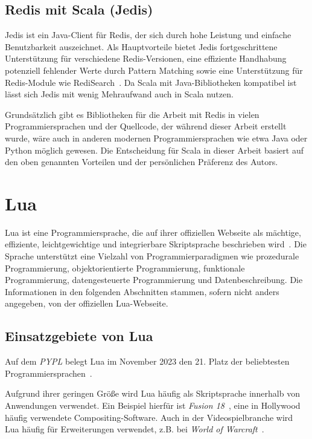 \subsection{Redis mit Scala (Jedis)} %
Jedis ist ein Java-Client für Redis, der sich durch hohe Leistung und einfache Benutzbarkeit auszeichnet. Als Hauptvorteile bietet Jedis fortgeschrittene Unterstützung für verschiedene Redis-Versionen, eine effiziente Handhabung potenziell fehlender Werte durch Pattern Matching sowie eine Unterstützung für Redis-Module wie RediSearch~\cite{redis_inc_jedis_2023}.
Da Scala mit Java-Bibliotheken kompatibel ist lässt sich Jedis mit wenig Mehraufwand auch in Scala nutzen. %

Grundsätzlich gibt es Bibliotheken für die Arbeit mit Redis in vielen Programmiersprachen und der Quellcode, der während dieser Arbeit erstellt wurde, wäre auch in anderen modernen Programmiersprachen wie etwa Java oder Python möglich gewesen.
Die Entscheidung für Scala in dieser Arbeit basiert auf den oben genannten Vorteilen und der persönlichen Präferenz des Autors.


\section{Lua}
Lua ist eine Programmiersprache, die auf ihrer offiziellen Webseite als mächtige, effiziente, leichtgewichtige und integrierbare Skriptsprache beschrieben wird~\cite{ierusalimschy_lua_nodate}. Die Sprache unterstützt eine Vielzahl von Programmierparadigmen wie prozedurale Programmierung, objektorientierte Programmierung, funktionale Programmierung, datengesteuerte Programmierung und Datenbeschreibung. Die Informationen in den folgenden Abschnitten stammen, sofern nicht anders angegeben, von der offiziellen Lua-Webseite.

\subsection{Einsatzgebiete von Lua}
Auf dem \emph{\acf{PYPL}} belegt Lua im November 2023 den 21. Platz der beliebtesten Programmiersprachen~\cite{carbonnelle_pypl_2023}.

Aufgrund ihrer geringen Größe wird Lua häufig als Skriptsprache innerhalb von Anwendungen verwendet. Ein Beispiel hierfür ist \emph{Fusion 18}~\cite{blackmagic_design_fusion_nodate}, eine in Hollywood häufig verwendete Compositing-Software. Auch in der Videospielbranche wird Lua häufig für Erweiterungen verwendet, z.B. bei \emph{World of Warcraft}~\cite{wowpedia_lua_2023}.

